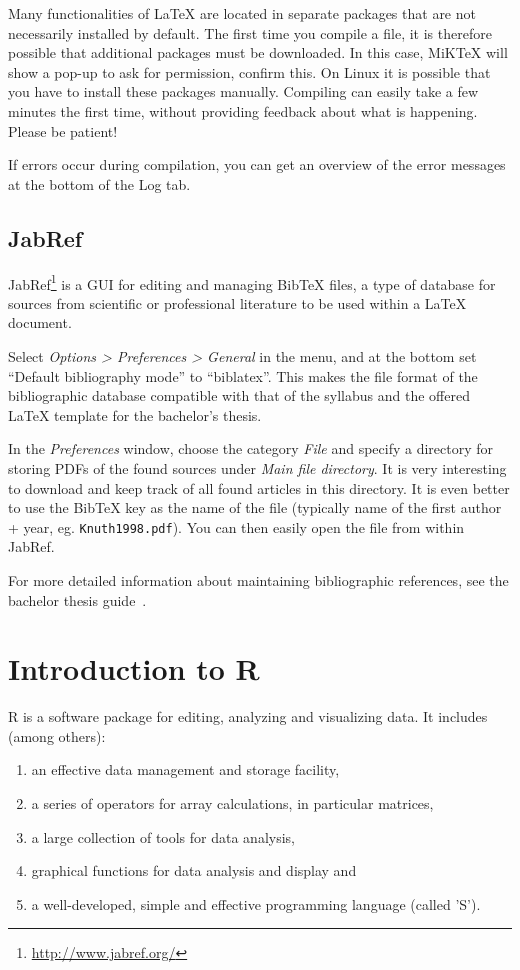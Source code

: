 Many functionalities of \LaTeX{} are located in separate packages that are not necessarily installed by default.
The first time you compile a file, it is therefore possible that additional packages must be downloaded.
In this case, MiK\TeX{} will show a pop-up to ask for permission, confirm this. 
On Linux it is possible that you have to install these packages manually. 
Compiling can easily take a few minutes the first time, without providing feedback about what is happening. Please be patient!

If errors occur during compilation, you can get an overview of the error messages at the bottom of the Log tab.

\subsection{JabRef}

JabRef\footnote{\url{http://www.jabref.org/}} is a GUI for editing and managing Bib\TeX{} files, a type of database for sources from scientific or professional literature to be used within a \LaTeX{} document.

Select \emph{Options > Preferences > General} in the menu, and at the bottom set ``Default bibliography mode'' to ``biblatex''. This makes the file format of the bibliographic database compatible with that of the syllabus and the offered \LaTeX{} template for the bachelor's thesis.

In the \emph{Preferences} window, choose the category \emph{File} and specify a directory for storing PDFs of the found sources under \emph{Main file directory}. It is very interesting to download and keep track of all found articles in this directory. It is even better to use the Bib\TeX{} key as the name of the file (typically name of the first author + year, eg. \texttt{Knuth1998.pdf}). You can then easily open the file from within JabRef.

For more detailed information about maintaining bibliographic references, see the bachelor thesis guide~\autocite{VanVreckem2017}.


\section{Introduction to R}

R is a software package for editing, analyzing and visualizing data. It includes (among others):

\begin{enumerate}
    \item an effective data management and storage facility,
    \item a series of operators for array calculations, in particular matrices,
    \item a large collection of tools for data analysis,
    \item graphical functions for data analysis and display and
    \item a well-developed, simple and effective programming language (called 'S').
\end{enumerate}

